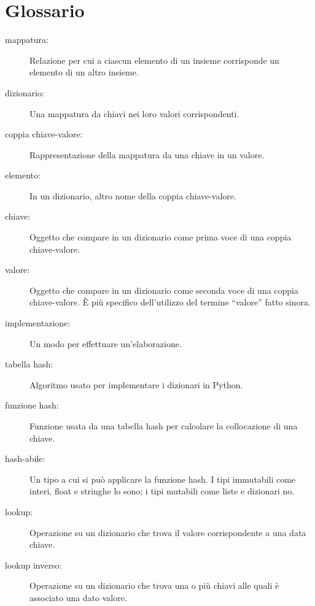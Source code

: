 \documentclass[10pt]{book}
\begin{document}
\section{Glossario}

\begin{description}

\item[mappatura:] Relazione per cui a ciascun elemento di un insieme corrisponde un elemento di un altro insieme.

\item[dizionario:] Una mappatura da chiavi nei loro valori corrispondenti.

\item[coppia chiave-valore:] Rappresentazione della mappatura da una chiave in un valore.

\item[elemento:] In un dizionario, altro nome della coppia chiave-valore.

\item[chiave:] Oggetto che compare in un dizionario come prima voce di una coppia chiave-valore.

\item[valore:] Oggetto che compare in un dizionario come seconda voce di una coppia chiave-valore. È più specifico dell'utilizzo del termine ``valore'' fatto sinora.

\item[implementazione:] Un modo per effettuare un'elaborazione.

\item[tabella hash:] Algoritmo usato per implementare i dizionari in Python.

\item[funzione hash:] Funzione usata da una tabella hash per calcolare la collocazione di una chiave.

\item[hash-abile:] Un tipo a cui si può applicare la funzione hash. I tipi immutabili come interi, float e stringhe lo sono; i tipi mutabili come liste e dizionari no.

\item[lookup:] Operazione su un dizionario che trova il valore corrispondente a una data chiave.

\item[lookup inverso:] Operazione su un dizionario che trova una o più chiavi alle quali è associato una dato valore.


\end{description}
\end{document}
